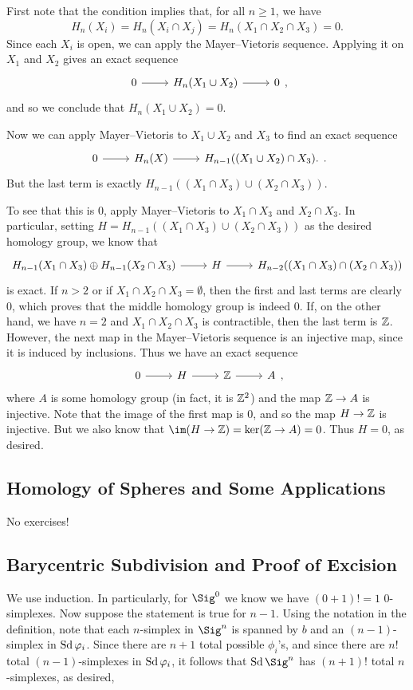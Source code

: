 \documentclass[../../solutions.tex]{subfiles}
\begin{document}
\begin{exercise} \leavevmode
First note that the condition implies that, for all $n\ge1$, we have
\[H_n(X_i)=H_n(X_i\cap X_j)=H_n(X_1\cap X_2\cap X_3)=0.\]
Since each $X_i$ is open, we can apply the Mayer--Vietoris sequence.
Applying it on $X_1$ and $X_2$ gives an exact sequence
\[\begin{tikzcd}
0\ar[r] & H_n(X_1\cup X_2)\ar[r] & 0
\end{tikzcd},\]
and so we conclude that $H_n(X_1\cup X_2)=0$.

Now we can apply Mayer--Vietoris to $X_1\cup X_2$ and $X_3$ to find an exact sequence
\[\begin{tikzcd}
0\ar[r] & H_n(X)\ar[r] & H_{n-1}((X_1\cup X_2)\cap X_3).
\end{tikzcd}.\]
But the last term is exactly $H_{n-1}((X_1\cap X_3)\cup(X_2\cap X_3))$.

To see that this is 0, apply Mayer--Vietoris to $X_1\cap X_3$ and $X_2\cap X_3$.
In particular, setting $H=H_{n-1}((X_1\cap X_3)\cup(X_2\cap X_3))$ as the desired homology group, we know that
\[\begin{tikzcd}
H_{n-1}(X_1\cap X_3)\oplus H_{n-1}(X_2\cap X_3)\ar[r] & H\ar[r] & H_{n-2}((X_1\cap X_3)\cap(X_2\cap X_3))
\end{tikzcd}\]
is exact.
If $n>2$ or if $X_1\cap X_2\cap X_3=\emptyset$, then the first and last terms are clearly 0, which proves that the middle homology group is indeed 0.
If, on the other hand, we have $n=2$ and $X_1\cap X_2\cap X_3$ is contractible, then the last term is $\mathbb{Z}$.
However, the next map in the Mayer--Vietoris sequence is an injective map, since it is induced by inclusions.
Thus we have an exact sequence
\[\begin{tikzcd}
0\ar[r] & H\ar[r] & \ZZ\ar[r] & A
\end{tikzcd},\]
where $A$ is some homology group (in fact, it is $\mathbb{Z}^2$) and the map $\mathbb{Z}\to A$ is injective.
Note that the image of the first map is 0, and so the map $H\to\mathbb{Z}$ is injective.
But we also know that $\im(H\to\ZZ)=\ker(\ZZ\to A)=0$.
Thus $H=0$, as desired.
\end{exercise}

\subsection{Homology of Spheres and Some Applications}
No exercises!

\subsection{Barycentric Subdivision and Proof of Excision}
\begin{exercise} \leavevmode
We use induction.
In particularly, for $\Sig^0$ we know we have $(0+1)!=1$ 0-simplexes.
Now suppose the statement is true for $n-1$.
Using the notation in the definition, note that each $n$-simplex in $\Sig^n$ is spanned by $b$ and an $(n-1)$-simplex in $\operatorname{Sd}\varphi_i$.
Since there are $n+1$ total possible $\phi_i$'s, and since there are $n!$ total $(n-1)$-simplexes in $\operatorname{Sd}\varphi_i$, it follows that $\Sd\Sig^n$ has $(n+1)!$ total $n$-simplexes, as desired,
\end{exercise}
\end{document}
